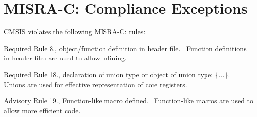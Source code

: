\chapter{MISRA-\/C: Compliance Exceptions }
\hypertarget{CMSIS_MISRA_Exceptions}{}\label{CMSIS_MISRA_Exceptions}
CMSIS violates the following MISRA-\/C: rules:\+

\begin{DoxyItemize}
\item Required Rule 8., object/\+function definition in header file.~\newline
 Function definitions in header files are used to allow \textquotesingle{}inlining\textquotesingle{}.\end{DoxyItemize}
\begin{DoxyItemize}
\item Required Rule 18., declaration of union type or object of union type:\+ \textquotesingle{}\{...\}\textquotesingle{}.~\newline
 Unions are used for effective representation of core registers.\end{DoxyItemize}
\begin{DoxyItemize}
\item Advisory Rule 19., Function-\/like macro defined.~\newline
 Function-\/like macros are used to allow more efficient code. \end{DoxyItemize}
